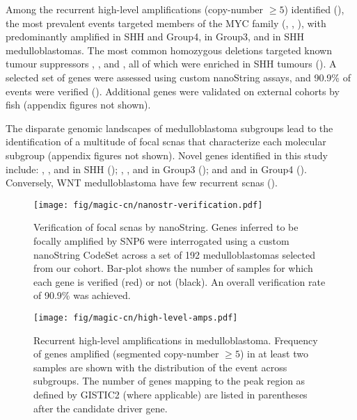 Among the recurrent high-level amplifications (copy-number $\geq 5$) identified (), the most prevalent events targeted members of the MYC family (, , ), with  predominantly amplified in SHH and Group4,  in Group3, and  in SHH medulloblastomas.
The most common homozygous deletions targeted known tumour suppressors , , and , all of which were enriched in SHH tumours (). A selected set of genes were assessed using custom nanoString assays, and 90.9\% of events were verified (). Additional genes were validated on external cohorts by \gls{fish} (appendix figures not shown).

The disparate genomic landscapes of medulloblastoma subgroups lead to the identification of a multitude of focal \gls{scnas} that characterize each molecular subgroup (appendix figures not shown). Novel genes identified in this study include: , , and  in SHH (); , , and  in Group3 (); and  and  in Group4 (). Conversely, WNT medulloblastoma have few recurrent \gls{scnas} (). 

\begin{SCfigure}[5][b]
	\centering
	\texttt{[image: fig/magic-cn/nanostr-verification.pdf]}
	\caption[Verification of focal \gls{scnas} by nanoString]
	{
	Verification of focal \gls{scnas} by nanoString.
	Genes inferred to be focally amplified by SNP6 were interrogated using a custom nanoString CodeSet across a set of 192 medulloblastomas selected from our cohort. Bar-plot shows the number of samples for which each gene is verified (red) or not (black). An overall verification rate of 90.9\% was achieved.
	}
	\label{fig:nanostr-verification}
\end{SCfigure}

\clearpage

\begin{SCfigure}[5]
	\centering
	\texttt{[image: fig/magic-cn/high-level-amps.pdf]}
	\caption[Recurrent high-level amplifications in medulloblastoma]
	{
	Recurrent high-level amplifications in medulloblastoma.
	Frequency of genes amplified (segmented copy-number $\geq 5$) in at least two samples are shown with the distribution of the event across subgroups. The number of genes mapping to the peak region as defined by GISTIC2 (where applicable) are listed in parentheses after the candidate driver gene.
	}
	\label{fig:high-level-amps}
\end{SCfigure}

